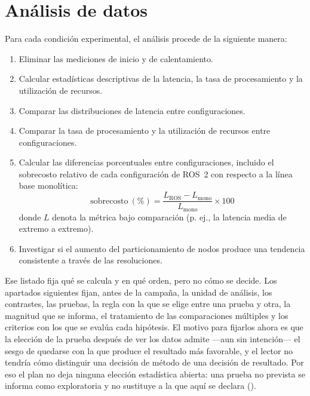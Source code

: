 \section{Análisis de datos}
\label{sec:analysis}

Para cada condición experimental, el análisis procede de la siguiente
manera:

\begin{enumerate}
  \item Eliminar las mediciones de inicio y de calentamiento.
  \item Calcular estadísticas descriptivas de la latencia, la tasa de
        procesamiento y la utilización de recursos.
  \item Comparar las distribuciones de latencia entre configuraciones.
  \item Comparar la tasa de procesamiento y la utilización de recursos
        entre configuraciones.
  \item Calcular las diferencias porcentuales entre configuraciones,
        incluido el sobrecosto relativo de cada configuración de ROS~2 con
        respecto a la línea base monolítica:
        \begin{equation}
          \mathrm{sobrecosto}\ (\%) = \frac{L_{\mathrm{ROS}} -
          L_{\mathrm{mono}}}{L_{\mathrm{mono}}} \times 100
          \label{eq:overhead}
        \end{equation}
        donde $L$ denota la métrica bajo comparación (p. ej., la latencia
        media de extremo a extremo).
  \item Investigar si el aumento del particionamiento de nodos produce una
        tendencia consistente a través de las resoluciones.
\end{enumerate}

Ese listado fija qué se calcula y en qué orden, pero no cómo se decide. Los
apartados siguientes fijan, antes de la campaña, la unidad de análisis, los
contrastes, las pruebas, la regla con la que se elige entre una prueba y otra,
la magnitud que se informa, el tratamiento de las comparaciones múltiples y
los criterios con los que se evalúa cada hipótesis. El motivo para fijarlos
ahora es que la elección de la prueba después de ver los datos admite ---aun
sin intención--- el sesgo de quedarse con la que produce el resultado más
favorable, y el lector no tendría cómo distinguir una decisión de método de
una decisión de resultado. Por eso el plan no deja ninguna elección
estadística abierta: una prueba no prevista se informa como exploratoria y no
sustituye a la que aquí se declara ().

